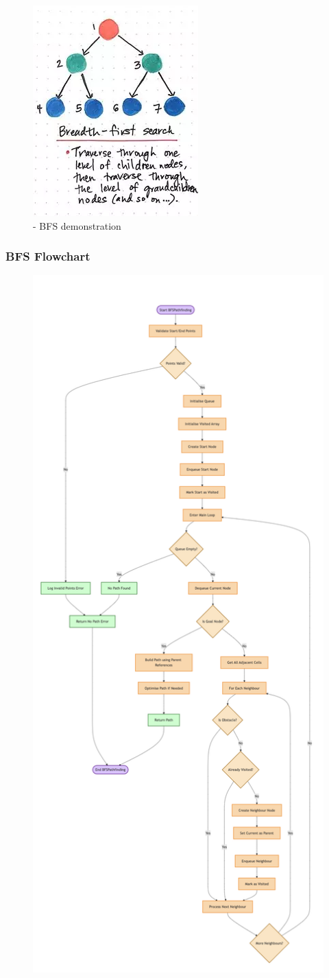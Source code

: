 \begin{figure}[!htbp]
    \centering
    \includegraphics[width=0.35\linewidth]{Images/bfsvdfs.png}
    \caption{- BFS demonstration \cite{bfsimg}}
\end{figure}

\newpage

\subsubsection{BFS Flowchart}

\begin{figure}[!htbp]
    \centering
    \includegraphics[width=0.56\linewidth]{Flowcharts/BFS2.png}
\end{figure}

